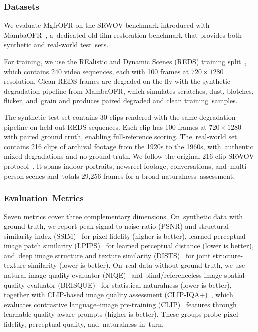 \documentclass[symmetry,article,accept,pdftex,moreauthors]{Definitions/mdpi}
\begin{document}
\subsubsection{Datasets}
\label{subsec:datasets}

We evaluate MgfrOFR on the SRWOV benchmark introduced with MambaOFR~\cite{mao2025mambaofr}, a~dedicated old film restoration benchmark that provides both synthetic and real-world test~sets.

For training, we use the REalistic and Dynamic Scenes (REDS) training split~\cite{nah2019reds}, which contains 240 video sequences, each with 100 frames at $720 \times 1280$ resolution. Clean REDS frames are degraded on the fly with the synthetic degradation pipeline from MambaOFR, which simulates scratches, dust, blotches, flicker, and~grain and produces paired degraded and clean training~samples.

The synthetic test set contains 30 clips rendered with the same degradation pipeline on held-out REDS sequences. Each clip has 100 frames at $720 \times 1280$ with paired ground truth, enabling full-reference scoring. The~real-world set contains 216 clips of archival footage from the 1920s to the 1960s, with~authentic mixed degradations and no ground truth. We follow the original 216-clip SRWOV protocol~\cite{mao2025mambaofr}. It spans indoor portraits, newsreel footage, conversations, and~multi-person scenes and~totals 29{,}256 frames for a broad naturalness~assessment.

\subsubsection{Evaluation~Metrics}
\label{subsec:eval_metrics}

Seven metrics cover three complementary dimensions. On~synthetic data with ground truth, we report peak signal-to-noise ratio (PSNR) and structural similarity index (SSIM)~\cite{wang2004ssim} for pixel fidelity (higher is better), learned perceptual image patch similarity (LPIPS)~\cite{zhang2018lpips} for learned perceptual distance (lower is better), and~deep image structure and texture similarity (DISTS)~\cite{ding2020dists} for joint structure-texture similarity (lower is better). On~real data without ground truth, we use natural image quality evaluator (NIQE)~\cite{mittal2012niqe} and blind/referenceless image spatial quality evaluator (BRISQUE)~\cite{mittal2012brisque} for statistical naturalness (lower is better), together with CLIP-based image quality assessment (CLIP-IQA+)~\cite{wang2023clipiqa}, which evaluates contrastive language--image pre-training (CLIP)~\cite{radford2021clip} features through learnable quality-aware prompts (higher is better). These groups probe pixel fidelity, perceptual quality, and~naturalness in~turn.
\end{document}
